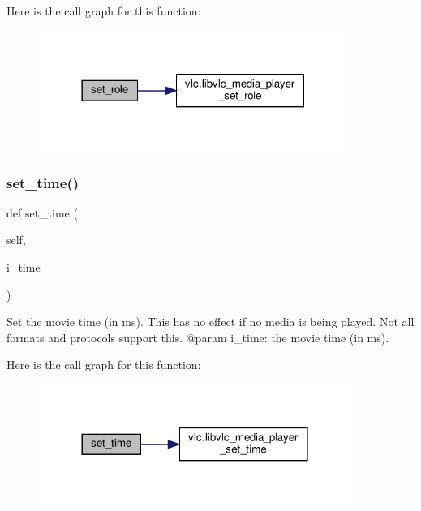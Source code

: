  Here is the call graph for this function\+:
\nopagebreak
\begin{figure}[H]
\begin{center}
\leavevmode
\includegraphics[width=285pt]{classvlc_1_1_media_player_a8373b7774e0be368ecc17eaf9177df55_cgraph}
\end{center}
\end{figure}
\mbox{\label{classvlc_1_1_media_player_a198f3296982fe799ca6de5e727550163}} 
\subsubsection{\texorpdfstring{set\+\_\+time()}{set\_time()}}
{\footnotesize\ttfamily def set\+\_\+time (\begin{DoxyParamCaption}\item[{}]{self,  }\item[{}]{i\+\_\+time }\end{DoxyParamCaption})}

\begin{DoxyVerb}Set the movie time (in ms). This has no effect if no media is being played.
Not all formats and protocols support this.
@param i_time: the movie time (in ms).
\end{DoxyVerb}
 Here is the call graph for this function\+:
\nopagebreak
\begin{figure}[H]
\begin{center}
\leavevmode
\includegraphics[width=288pt]{classvlc_1_1_media_player_a198f3296982fe799ca6de5e727550163_cgraph}
\end{center}
\end{figure}
\mbox{\label{classvlc_1_1_media_player_a21cfaebe83eae792ac9898aa5c40045f}} 
